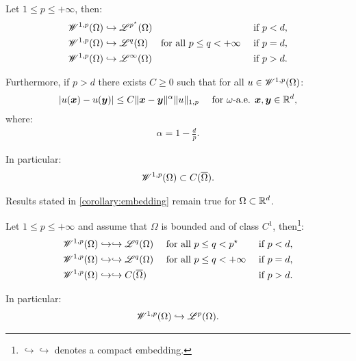 \begin{corollary}
    Let $1 \leq p \leq +\infty$, then:
    \begin{align}
        \mathscr{W}^{1, p}(\Omega) & \hookrightarrow \mathscr{L}^{p^{\star}}(\Omega) & \text{ if } p < d, \\
        \mathscr{W}^{1, p}(\Omega) & \hookrightarrow \mathscr{L}^{q}(\Omega) \quad \text{ for all } p \leq q < +\infty & \text{ if } p = d, \\
        \mathscr{W}^{1, p}(\Omega) & \hookrightarrow \mathscr{L}^{\infty}(\Omega) & \text{ if } p > d.
    \end{align}

    Furthermore, if $p > d$ there exists $C \geq 0$ such that for all $u \in \mathscr{W}^{1, p}(\Omega)$:
    \begin{gather}
        \lvert u(\bm{x}) - u(\bm{y}) \rvert \leq C \lVert \bm{x} - \bm{y} \rVert^{\alpha} \lVert u \rVert_{1, p} \quad \text{ for } \omega \text{-a.e. } \bm{x}, \bm{y} \in \mathbb{R}^{d},
    \end{gather}
    where:
    \begin{gather}
        \alpha = 1 - \frac{d}{p}.
    \end{gather}

    In particular:
    \begin{gather}
        \mathscr{W}^{1, p}(\Omega) \subset C(\overline{\Omega}).
    \end{gather}
\end{corollary}

\begin{corollary}
    Results stated in \cref{corollary:embedding} remain true for $\Omega \subset \mathbb{R}^{d}$.
\end{corollary}

\begin{theorem}
    Let $1 \leq p \leq +\infty$ and assume that $\Omega$ is bounded and of class $C^1$, then\footnote{$\hookrightarrow \hookrightarrow$ denotes a compact embedding.}:
    \begin{align}
        \mathscr{W}^{1, p}(\Omega) & \hookrightarrow \hookrightarrow \mathscr{L}^{q}(\Omega) \quad \text{ for all } p \leq q < p^{\star} & \text{ if } p < d, \\
        \mathscr{W}^{1, p}(\Omega) & \hookrightarrow \hookrightarrow \mathscr{L}^{q}(\Omega) \quad \text{ for all } p \leq q < +\infty & \text{ if } p = d, \\
        \mathscr{W}^{1, p}(\Omega) & \hookrightarrow \hookrightarrow C(\overline{\Omega}) & \text{ if } p > d.
    \end{align}

    In particular:
    \begin{gather}
        \mathscr{W}^{1, p}(\Omega) \hookrightarrow \mathscr{L}^{p}(\Omega).
    \end{gather}
\end{theorem}

